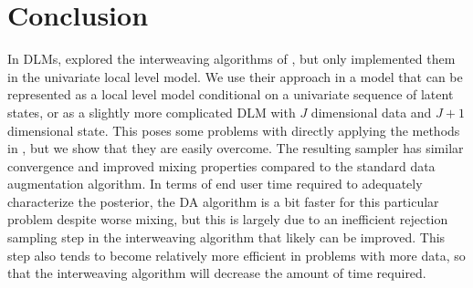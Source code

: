 \documentclass[graybox]{svmult}
\begin{document}
\section{Conclusion}\label{sec:conclusion}
In DLMs, \citet{simpson2014interweaving} explored the interweaving algorithms of \citet{yu2011center}, but only implemented them in the univariate local level model. We use their approach in a model that can be represented as a local level model conditional on a univariate sequence of latent states, or as a slightly more complicated DLM with $J$ dimensional data and $J+1$ dimensional state. This poses some problems with directly applying the methods in \citet{simpson2014interweaving}, but we show that they are easily overcome. The resulting sampler has similar convergence and improved mixing properties compared to the standard data augmentation algorithm. In terms of end user time required to adequately characterize the posterior, the DA algorithm is a bit faster for this particular problem despite worse mixing, but this is largely due to an inefficient rejection sampling step in the interweaving algorithm \citep{simpson2014interweaving} that likely can be improved. This step also tends to become relatively more efficient in problems with more data, so that the interweaving algorithm will decrease the amount of time required.



\end{document}
